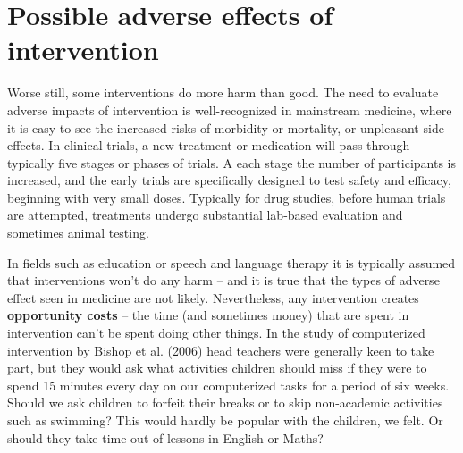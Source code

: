 \documentclass{krantz}
\begin{document}
\hypertarget{possible-adverse-effects-of-intervention}{%
\section{Possible adverse effects of intervention}\label{possible-adverse-effects-of-intervention}}

Worse still, some interventions do more harm than good. The need to evaluate adverse impacts of intervention is well-recognized in mainstream medicine, where it is easy to see the increased risks of morbidity or mortality, or unpleasant side effects. In clinical trials, a new treatment or medication will pass through typically five stages or phases of trials. A each stage the number of participants is increased, and the early trials are specifically designed to test safety and efficacy, beginning with very small doses. Typically for drug studies, before human trials are attempted, treatments undergo substantial lab-based evaluation and sometimes animal testing.

In fields such as education or speech and language therapy it is typically assumed that interventions won't do any harm -- and it is true that the types of adverse effect seen in medicine are not likely. Nevertheless, any intervention creates \textbf{opportunity costs}  -- the time (and sometimes money) that are spent in intervention can't be spent doing other things. In the study of computerized intervention by Bishop et al. (\protect\hyperlink{ref-bishop2006}{2006}) head teachers were generally keen to take part, but they would ask what activities children should miss if they were to spend 15 minutes every day on our computerized tasks for a period of six weeks. Should we ask children to forfeit their breaks or to skip non-academic activities such as swimming? This would hardly be popular with the children, we felt. Or should they take time out of lessons in English or Maths?
\end{document}
